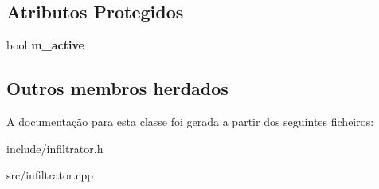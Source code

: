 \subsection*{Atributos Protegidos}
\begin{DoxyCompactItemize}
\item 
\mbox{\label{classInfiltrator_a57568f6f782efc405e959e5bfffc8163}} 
bool {\bfseries m\+\_\+active}
\end{DoxyCompactItemize}
\subsection*{Outros membros herdados}


A documentação para esta classe foi gerada a partir dos seguintes ficheiros\+:\begin{DoxyCompactItemize}
\item 
include/infiltrator.\+h\item 
src/infiltrator.\+cpp\end{DoxyCompactItemize}
